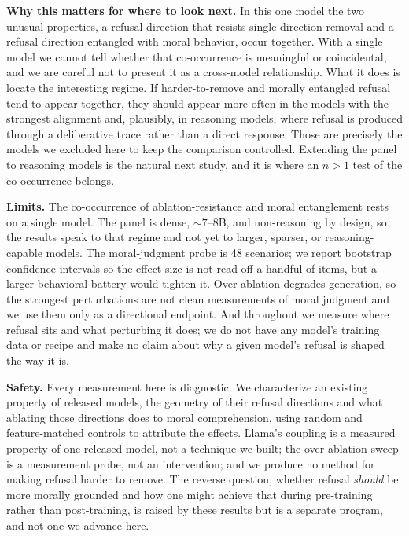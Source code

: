 \textbf{Why this matters for where to look next.} In this one model the two
unusual properties, a refusal direction that resists single-direction removal and
a refusal direction entangled with moral behavior, occur together. With a single
model we cannot tell whether that co-occurrence is meaningful or coincidental, and
we are careful not to present it as a cross-model relationship. What it does is
locate the interesting regime. If harder-to-remove and morally entangled refusal
tend to appear together, they should appear more often in the models with the
strongest alignment and, plausibly, in reasoning models, where refusal is produced
through a deliberative trace rather than a direct response. Those are precisely the
models we excluded here to keep the comparison controlled. Extending the panel to
reasoning models is the natural next study, and it is where an \(n>1\) test of the
co-occurrence belongs.

\textbf{Limits.} The co-occurrence of ablation-resistance and moral entanglement rests
on a single model. The panel is dense, \({\sim}7\)--8B, and non-reasoning by design,
so the results speak to that regime and not yet to larger, sparser, or
reasoning-capable models. The moral-judgment probe is 48 scenarios; we report
bootstrap confidence intervals so the effect size is not read off a handful of
items, but a larger behavioral battery would tighten it. Over-ablation degrades
generation, so the strongest perturbations are not clean measurements of moral
judgment and we use them only as a directional endpoint. And throughout we measure
where refusal sits and what perturbing it does; we do not have any model's
training data or recipe and make no claim about why a given model's refusal is
shaped the way it is.

\textbf{Safety.} Every measurement here is diagnostic. We characterize an existing
property of released models, the geometry of their refusal directions and what
ablating those directions does to moral comprehension, using random and
feature-matched controls to attribute the effects. Llama's coupling is a measured
property of one released model, not a technique we built; the over-ablation sweep
is a measurement probe, not an intervention; and we produce no method for making
refusal harder to remove. The reverse question, whether refusal \emph{should} be more
morally grounded and how one might achieve that during pre-training rather than
post-training, is raised by these results but is a separate program, and not one we
advance here.

